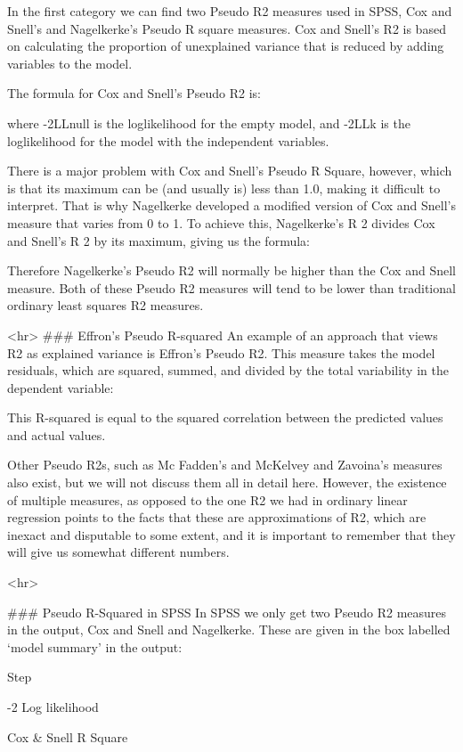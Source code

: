 In the first category we can find two Pseudo R2   measures used in SPSS, Cox and Snell’s and Nagelkerke’s Pseudo R square measures. Cox and Snell's R2 is based on calculating the proportion of unexplained variance that is reduced by adding variables to the model.

The formula for Cox and Snell's Pseudo R2 is:

where -2LLnull is the loglikelihood for the empty model, and -2LLk is the loglikelihood for the model with the independent variables.

There is a major problem with Cox and Snell’s Pseudo R Square, however, which is that its maximum can be (and usually is) less than 1.0, making it difficult to interpret. That is why Nagelkerke developed a modified version of Cox and Snell’s measure that varies from 0 to 1. To achieve this, Nagelkerke's R 2 divides Cox and Snell's R 2 by its maximum, giving us the formula:

Therefore Nagelkerke's Pseudo R2 will normally be higher than the Cox and Snell measure. Both of these Pseudo R2 measures will tend to be lower than traditional ordinary least squares R2 measures.


<hr>
### Effron's Pseudo R-squared
An example of an approach that views R2 as explained variance is Effron’s Pseudo R2. This measure takes the model residuals, which are squared, summed, and divided by the total variability in the dependent variable:


This R-squared is equal to the squared correlation between the predicted values and actual values. 

Other Pseudo R2s, such as Mc Fadden’s and McKelvey and Zavoina’s measures also exist, but we will not discuss them all in detail here. However, the existence of multiple measures, as opposed to the one R2 we had in ordinary linear regression points to the facts that these are approximations of R2, which are inexact and disputable to some extent, and it is important to remember that they will give us somewhat different numbers.

<hr>



### Pseudo R-Squared in SPSS
In SPSS we only get two Pseudo R2 measures in the output, Cox and Snell and Nagelkerke. These are given in the box labelled ‘model summary’ in the output:

Step

-2 Log likelihood

Cox & Snell R Square

